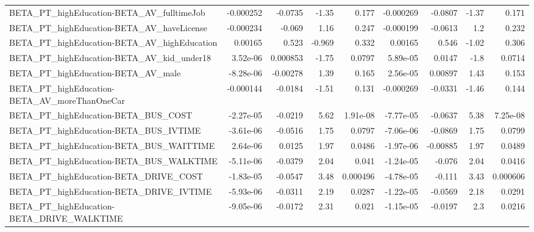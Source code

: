 \begin{tabular}{lrrrrrrrr}
BETA\_PT\_highEducation-BETA\_AV\_fulltimeJob          &   -0.000252 &      -0.0735 &     -1.35 &    0.177 &  -0.000269 &     -0.0807 &        -1.37 &         0.171 \\
BETA\_PT\_highEducation-BETA\_AV\_haveLicense          &   -0.000234 &       -0.069 &      1.16 &    0.247 &  -0.000199 &     -0.0613 &          1.2 &         0.232 \\
BETA\_PT\_highEducation-BETA\_AV\_highEducation        &     0.00165 &        0.523 &    -0.969 &    0.332 &    0.00165 &       0.546 &        -1.02 &         0.306 \\
BETA\_PT\_highEducation-BETA\_AV\_kid\_under18          &    3.52e-06 &     0.000853 &     -1.75 &   0.0797 &   5.89e-05 &      0.0147 &         -1.8 &        0.0714 \\
BETA\_PT\_highEducation-BETA\_AV\_male                 &   -8.28e-06 &     -0.00278 &      1.39 &    0.165 &   2.56e-05 &     0.00897 &         1.43 &         0.153 \\
BETA\_PT\_highEducation-BETA\_AV\_moreThanOneCar       &   -0.000144 &      -0.0184 &     -1.51 &    0.131 &  -0.000269 &     -0.0331 &        -1.46 &         0.144 \\
BETA\_PT\_highEducation-BETA\_BUS\_COST                &   -2.27e-05 &      -0.0219 &      5.62 & 1.91e-08 &  -7.77e-05 &     -0.0637 &         5.38 &      7.25e-08 \\
BETA\_PT\_highEducation-BETA\_BUS\_IVTIME              &   -3.61e-06 &      -0.0516 &      1.75 &   0.0797 &  -7.06e-06 &     -0.0869 &         1.75 &        0.0799 \\
BETA\_PT\_highEducation-BETA\_BUS\_WAITTIME            &    2.64e-06 &       0.0125 &      1.97 &   0.0486 &  -1.97e-06 &    -0.00885 &         1.97 &        0.0489 \\
BETA\_PT\_highEducation-BETA\_BUS\_WALKTIME            &   -5.11e-06 &      -0.0379 &      2.04 &    0.041 &  -1.24e-05 &      -0.076 &         2.04 &        0.0416 \\
BETA\_PT\_highEducation-BETA\_DRIVE\_COST              &   -1.83e-05 &      -0.0547 &      3.48 & 0.000496 &  -4.78e-05 &      -0.111 &         3.43 &      0.000606 \\
BETA\_PT\_highEducation-BETA\_DRIVE\_IVTIME            &   -5.93e-06 &      -0.0311 &      2.19 &   0.0287 &  -1.22e-05 &     -0.0569 &         2.18 &        0.0291 \\
BETA\_PT\_highEducation-BETA\_DRIVE\_WALKTIME          &   -9.05e-06 &      -0.0172 &      2.31 &    0.021 &  -1.15e-05 &     -0.0197 &          2.3 &        0.0216 \\

\end{tabular}
